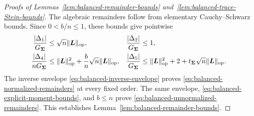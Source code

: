 \documentclass{article}
\theoremstyle{plain} %
\theoremstyle{definition} %
\theoremstyle{definition} %
\begin{document}
\begin{proof}[Proofs of Lemmas~\ref{lem:balanced-remainder-bounds}
and~\ref{lem:balanced-trace-Stein-bounds}]
The algebraic remainders follow from elementary Cauchy--Schwarz bounds.
Since $0<b/n\leq1$, these bounds give pointwise
\begin{align*}
    \frac{|\Delta_1|}{G_{\boldsymbol{\Sigma}}}
       &\leq \sqrt n\lVert\boldsymbol{L}\rVert_{\rm op},
    &
    \frac{|\Delta_2|}{G_{\boldsymbol{\Sigma}}}
       &\leq1,\\
    \frac{|\Delta_4|}{nG_{\boldsymbol{\Sigma}}}
       &\leq \lVert\boldsymbol{L}\rVert_{\rm op}^2
          +\frac bn\sqrt n\lVert\boldsymbol{L}\rVert_{\rm op},
    &
    \frac{|\Delta_5|}{G_{\boldsymbol{\Sigma}}}
       &\leq \lVert\boldsymbol{L}\rVert_{\rm op}^2+2
          +t_{\boldsymbol{\Sigma}}\sqrt n\lVert\boldsymbol{L}\rVert_{\rm op}.
\end{align*}
The inverse envelope \eqref{eq:balanced-inverse-envelope} proves
\eqref{eq:balanced-normalized-remainders} at every fixed order.  The same
envelope, \eqref{eq:balanced-explicit-moment-bounds}, and $b\leq n$ prove
\eqref{eq:balanced-unnormalized-remainders}.  This establishes
Lemma~\ref{lem:balanced-remainder-bounds}.


\end{proof}
\end{document}
